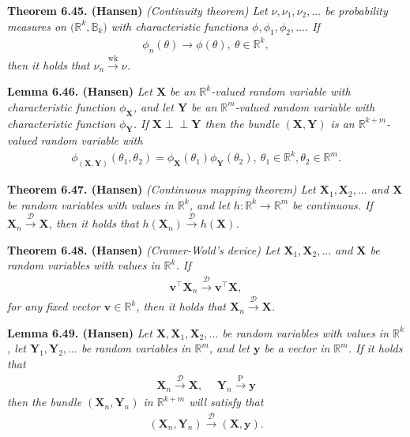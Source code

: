 \documentclass[a4paper,12pt,openany]{book}
\begin{document}
\textbf{Theorem 6.45. (Hansen)} \emph{(Continuity theorem) Let \(\nu,\nu_1,\nu_2,...\) be probability measures on \(\big(\mathbb{R}^k,\mathbb{B}_k\big)\) with characteristic functions \(\phi,\phi_1,\phi_2,...\). If}
\begin{align*}
    \phi_n(\theta)\to \phi(\theta),\ \theta\in\mathbb{R}^k,\tag{6.47}
\end{align*}
\emph{then it holds that \(\nu_n\stackrel{\text{wk}}{\to}\nu\).}

\textbf{Lemma 6.46. (Hansen)} \emph{Let \(\mathbf{X}\) be an \(\mathbb{R}^k\)-valued random variable with characteristic function \(\phi_\mathbf{X}\), and let \(\mathbf{Y}\) be an \(\mathbb{R}^m\)-valued random variable with characteristic function \(\phi_\mathbf{Y}\). If \(\mathbf{X} \perp \!\!\! \perp \mathbf{Y}\) then the bundle \((\mathbf{X},\mathbf{Y})\) is an \(\mathbb{R}^{k+m}\)-valued random variable with}
\begin{align*}
    \phi_{(\mathbf{X},\mathbf{Y})}(\theta_1,\theta_2)=\phi_\mathbf{X}(\theta_1)\phi_\mathbf{Y}(\theta_2),\ \theta_1\in\mathbb{R}^k,\theta_2\in\mathbb{R}^m.\tag{6.49}
\end{align*}

\textbf{Theorem 6.47. (Hansen)} \emph{(Continuous mapping theorem) Let \(\mathbf{X}_1,\mathbf{X}_2,...\) and \(\mathbf{X}\) be random variables with values in \(\mathbb{R}^k\), and let \(h : \mathbb{R}^k\to\mathbb{R}^m\) be continuous. If \(\mathbf{X}_n\stackrel{\mathcal{D}}{\to} \mathbf{X}\), then it holds that \(h(\mathbf{X}_n)\stackrel{\mathcal{D}}{\to} h(\mathbf{X})\).}

\textbf{Theorem 6.48. (Hansen)} \emph{(Cramer-Wold's device) Let \(\mathbf{X}_1,\mathbf{X}_2,...\) and \(\mathbf{X}\) be random variables with values in \(\mathbb{R}^k\). If}
\begin{align*}
    \mathbf{v}^\top\mathbf{X}_n\stackrel{\mathcal{D}}{\to} \mathbf{v}^\top\mathbf{X},\tag{6.51}
\end{align*}
\emph{for any fixed vector \(\mathbf{v}\in\mathbb{R}^k\), then it holds that \(\mathbf{X}_n\stackrel{\mathcal{D}}{\to} \mathbf{X}\).}

\textbf{Lemma 6.49. (Hansen)} \emph{Let \(\mathbf{X},\mathbf{X}_1,\mathbf{X}_2,...\) be random variables with values in \(\mathbb{R}^k\), let \(\mathbf{Y}_1,\mathbf{Y}_2,...\) be random variables in \(\mathbb{R}^m\), and let \(\mathbf{y}\) be a vector in \(\mathbb{R}^m\). If it holds that}
\begin{align*}
    \mathbf{X}_n\stackrel{\mathcal{D}}{\to} \mathbf{X},\hspace{15pt}\mathbf{Y}_n\stackrel{\text{P}}{\to} \mathbf{y}
\end{align*}
\emph{then the bundle \((\mathbf{X}_n,\mathbf{Y}_n)\) in \(\mathbb{R}^{k+m}\) will satisfy that}
\begin{align*}
    (\mathbf{X}_n,\mathbf{Y}_n)\stackrel{\mathcal{D}}{\to} (\mathbf{X},\mathbf{y}).
\end{align*}
\end{document}
